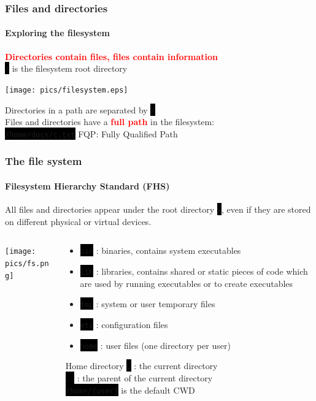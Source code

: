 \documentclass[unknownkeysallowed, 10pt, a4 paper, handout]{beamer}
\newcommand{\focus}[1]{\textbf{\textcolor{red}{#1}}}
\newcommand{\code}[1]{\colorbox{black}{\color{green}\texttt{#1}}}
\begin{document}
\begin{frame}[c]
  \begin{block}{}
    \frametitle{Files and directories}
    \framesubtitle{Exploring the filesystem}

    \focus{Directories contain files, files contain information}
    \vspace{3mm} \\

    \code{/} is the filesystem root directory
    \vspace{-3mm} \\
    \begin{center}
      \texttt{[image: pics/filesystem.eps]}
    \end{center}

    Directories in a path are separated by \code{/}
    \vspace{3mm} \\
    Files and directories have a \focus{full path} in the filesystem: \\
    \code{/home/docs/c.txt} \hspace{4mm}FQP: Fully Qualified Path
  \end{block}
\end{frame}


\begin{frame}[label=filesystem]
  \frametitle{The file system}
  \framesubtitle{Filesystem Hierarchy Standard (FHS)}
  All files and directories appear under the root directory \code{/},
  even if they are stored on different physical or virtual devices.
  \begin{columns}[T]
    \begin{column}{.23\textwidth}
      \texttt{[image: pics/fs.png]}
    \end{column}
    \hfill
    \begin{column}{.73\textwidth}
      \small{
      \begin{itemize}
	\item \code{bin} : binaries, contains system executables
        \item \code{lib} : libraries, contains shared or static pieces of
          code which are used by running executables or to create executables
        \item \code{tmp} : system or user temporary files
        \item \code{etc} : configuration files
	\item \code{home} : user files (one directory per user)
      \end{itemize}
    }
    \begin{alertblock}{Home directory}
      \code{.} : the current directory\\
      \code{..} : the parent of the current directory\\
      \code{/home/\{user\}} is the default CWD
    \end{alertblock}
    \end{column}
  \end{columns}
\end{frame}
\end{document}
